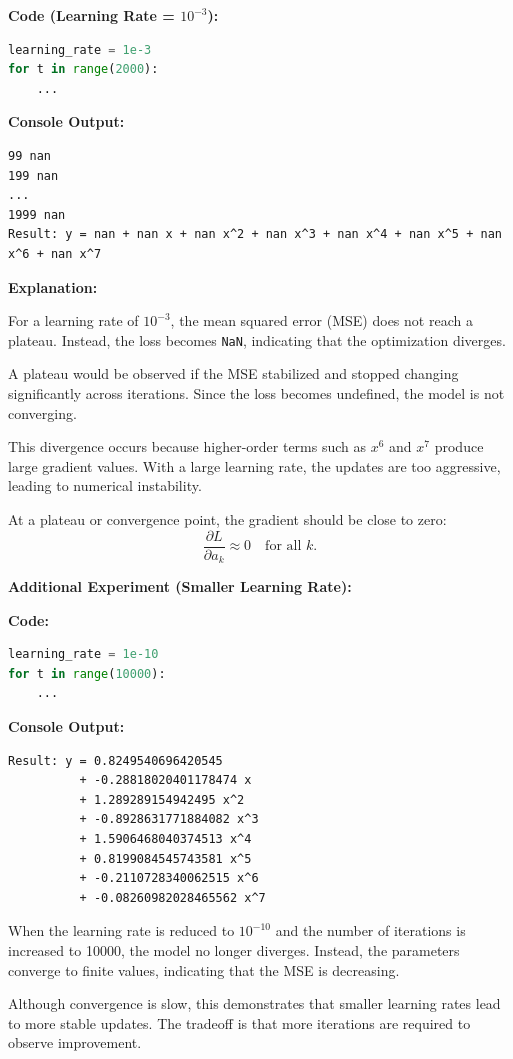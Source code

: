 \documentclass[10pt]{article}
\begin{document}
\begin{enumerate}[label=\textbf{1(\alph*)}]
\textbf{Code (Learning Rate = $10^{-3}$):}
\begin{lstlisting}[language=Python]
learning_rate = 1e-3
for t in range(2000):
    ...
\end{lstlisting}

\textbf{Console Output:}
\begin{lstlisting}
99 nan
199 nan
...
1999 nan
Result: y = nan + nan x + nan x^2 + nan x^3 + nan x^4 + nan x^5 + nan x^6 + nan x^7
\end{lstlisting}

\textbf{Explanation:}

For a learning rate of $10^{-3}$, the mean squared error (MSE) does not reach a plateau. Instead, the loss becomes \texttt{NaN}, indicating that the optimization diverges.

A plateau would be observed if the MSE stabilized and stopped changing significantly across iterations. Since the loss becomes undefined, the model is not converging.

This divergence occurs because higher-order terms such as $x^6$ and $x^7$ produce large gradient values. With a large learning rate, the updates are too aggressive, leading to numerical instability.

At a plateau or convergence point, the gradient should be close to zero:
\[
\frac{\partial L}{\partial a_k} \approx 0 \quad \text{for all } k.
\]

\bigskip

\textbf{Additional Experiment (Smaller Learning Rate):}

\textbf{Code:}
\begin{lstlisting}[language=Python]
learning_rate = 1e-10
for t in range(10000):
    ...
\end{lstlisting}

\textbf{Console Output:}
\begin{lstlisting}
Result: y = 0.8249540696420545 
          + -0.28818020401178474 x 
          + 1.289289154942495 x^2 
          + -0.8928631771884082 x^3 
          + 1.5906468040374513 x^4 
          + 0.8199084545743581 x^5 
          + -0.2110728340062515 x^6 
          + -0.08260982028465562 x^7
\end{lstlisting}

When the learning rate is reduced to $10^{-10}$ and the number of iterations is increased to 10000, the model no longer diverges. Instead, the parameters converge to finite values, indicating that the MSE is decreasing.

Although convergence is slow, this demonstrates that smaller learning rates lead to more stable updates. The tradeoff is that more iterations are required to observe improvement.


\end{enumerate}
\end{document}
